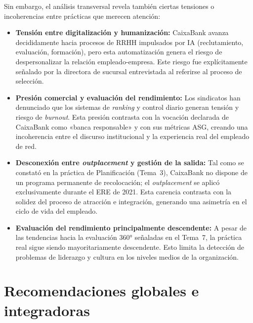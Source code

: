 Sin embargo, el análisis transversal revela también ciertas tensiones o
incoherencias entre prácticas que merecen atención:

\begin{itemize}
  \item \textbf{Tensión entre digitalización y humanización:} CaixaBank
        avanza decididamente hacia procesos de RRHH impulsados por IA
        (reclutamiento, evaluación, formación), pero esta automatización
        genera el riesgo de despersonalizar la relación empleado-empresa.
        Este riesgo fue explícitamente señalado por la directora de sucursal
        entrevistada al referirse al proceso de selección.

  \item \textbf{Presión comercial y evaluación del rendimiento:} Los sindicatos
        han denunciado que los sistemas de \textit{ranking} y control diario
        generan tensión y riesgo de \textit{burnout}. Esta presión contrasta
        con la vocación declarada de CaixaBank como «banca responsable» y
        con sus métricas ASG, creando una incoherencia entre el discurso
        institucional y la experiencia real del empleado de red.

  \item \textbf{Desconexión entre \textit{outplacement} y gestión de la
        salida:} Tal como se constató en la práctica de Planificación (Tema~3),
        CaixaBank no dispone de un programa permanente de recolocación; el
        \textit{outplacement} se aplicó exclusivamente durante el ERE de 2021.
        Esta carencia contrasta con la solidez del proceso de atracción e
        integración, generando una asimetría en el ciclo de vida del empleado.

  \item \textbf{Evaluación del rendimiento principalmente descendente:} A pesar
        de las tendencias hacia la evaluación 360° señaladas en el Tema~7,
        la práctica real sigue siendo mayoritariamente descendente. Esto limita
        la detección de problemas de liderazgo y cultura en los niveles medios
        de la organización.
\end{itemize}

\section{Recomendaciones globales e integradoras}

